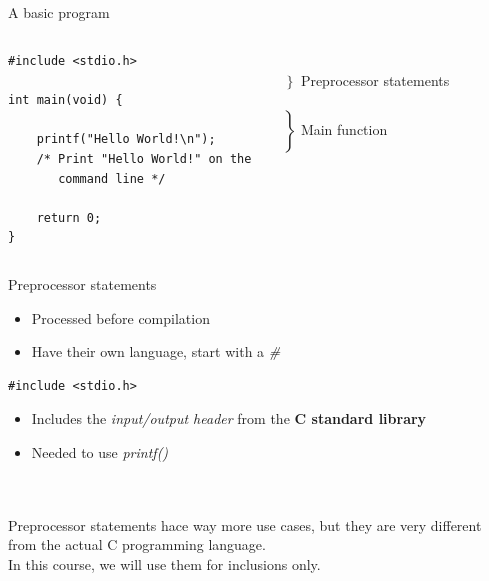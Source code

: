 \subsection{}
\begin{frame}[fragile]{A basic program}
	\begin{columns}[T]
		\begin{lstlisting}
#include <stdio.h>

int main(void) {

	printf("Hello World!\n");
	/* Print "Hello World!" on the
	   command line */

	return 0;
}
\end{lstlisting}
		
		\ \\$\left. \begin{array}{c}\\\end{array}\right\rbrace $ Preprocessor statements
		\ \\\ \\$\left. \begin{array}{c}\\\\\\\\\\\\\end{array}\right\rbrace $ Main function
	\end{columns}
\end{frame}
\begin{frame}[fragile]{Preprocessor statements}	
	\begin{itemize}
		\item Processed before compilation
		\item Have their own language, start with a \textit{\#}
	\end{itemize}
	\begin{lstlisting}
#include <stdio.h>
\end{lstlisting}
	\begin{itemize}
		\item Includes the \textit{input/output header} from the \textbf{C standard library}
		\item Needed to use \textit{printf()}
	\end{itemize}\ \\ \ \\
	Preprocessor statements hace way more use cases, but they are very different from the actual C programming language.\\
	In this course, we will use them for inclusions only.
\end{frame}
